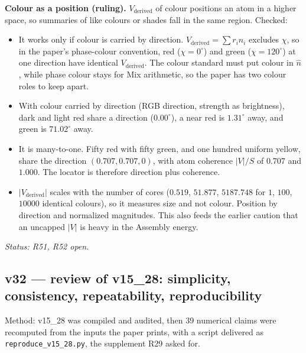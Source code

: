 \documentclass[11pt]{article}
\begin{document}
\textbf{Colour as a position (ruling).} $V_{\text{derived}}$ of colour
positions an atom in a higher space, so summaries of like colours or shades
fall in the same region. Checked:
\begin{itemize}
\item It works only if colour is carried by direction.
$V_{\text{derived}}=\sum r_i\hat n_i$ excludes $\chi$, so in the paper's
phase-colour convention, red ($\chi=0^\circ$) and green
($\chi=120^\circ$) at one direction have identical $V_{\text{derived}}$.
The colour standard must put colour in $\hat n$, while phase colour stays
for Mix arithmetic, so the paper has two colour roles to keep apart.
\item With colour carried by direction (RGB direction, strength as
brightness), dark and light red share a direction ($0.00^\circ$), a near
red is $1.31^\circ$ away, and green is $71.02^\circ$ away.
\item It is many-to-one. Fifty red with fifty green, and one hundred
uniform yellow, share the direction $(0.707,0.707,0)$, with atom coherence
$|V|/S$ of $0.707$ and $1.000$. The locator is therefore direction plus
coherence.
\item $|V_{\text{derived}}|$ scales with the number of cores ($0.519$,
$51.877$, $5187.748$ for $1$, $100$, $10000$ identical colours), so it
measures size and not colour. Position by direction and normalized
magnitudes. This also feeds the earlier caution that an uncapped $|V|$ is
heavy in the Assembly energy.
\end{itemize}
\emph{Status: R51, R52 open.}


\subsection*{v32 --- review of v15\_28: simplicity, consistency, repeatability, reproducibility}
Method: v15\_28 was compiled and audited, then 39 numerical claims were
recomputed from the inputs the paper prints, with a script delivered as
\texttt{reproduce\_v15\_28.py}, the supplement R29 asked for.
\end{document}

